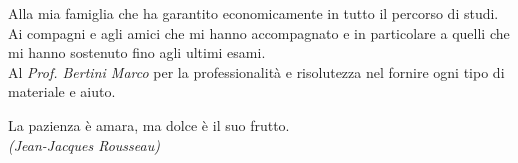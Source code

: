 \documentclass[11pt]{toptesi}
\makeatletter
\newcommand\listofcodes{%
 \iffrontmatter\else\frontmattertrue\fi
 \if@openright\cleardoublepage\else\clearpage\fi
 \begingroup\def\chapter##1{\@schapter}
 \phantomsection %
 \lstlistoflistings 
 \endgroup
}
\makeatother
\begin{document}
\frontespizio



\frontmatter

\begin{flushright}
\noindent
Alla mia famiglia che ha garantito economicamente in tutto il percorso di studi.\\
\vspace{1cm}
Ai compagni e agli amici che mi hanno accompagnato e in particolare a quelli che mi hanno sostenuto fino agli ultimi esami. \\
\vspace{1cm}
Al \textit{Prof. Bertini Marco} per la professionalità e risolutezza nel fornire ogni tipo di materiale e aiuto.
\end{flushright}
\cleardoublepage


\begin{flushright}
\noindent
La pazienza è amara, ma dolce è il suo frutto. \\
\textit{(Jean-Jacques Rousseau)}
\end{flushright}
\cleardoublepage





\tableofcontents

\listoffigures




\mainmatter









\nocite{*}
\printbibliography
\end{document}
